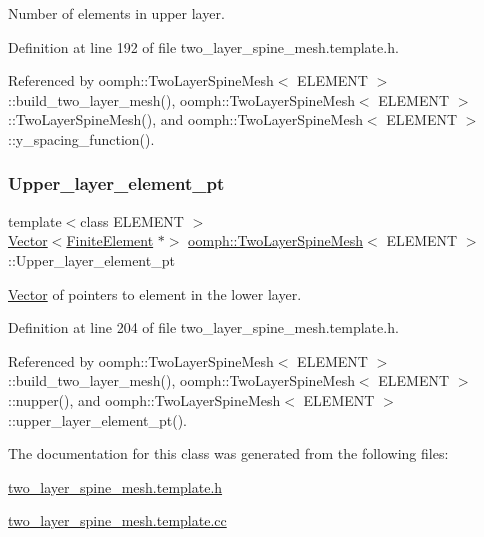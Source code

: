 Number of elements in upper layer. 



Definition at line 192 of file two\+\_\+layer\+\_\+spine\+\_\+mesh.\+template.\+h.



Referenced by oomph\+::\+Two\+Layer\+Spine\+Mesh$<$ E\+L\+E\+M\+E\+N\+T $>$\+::build\+\_\+two\+\_\+layer\+\_\+mesh(), oomph\+::\+Two\+Layer\+Spine\+Mesh$<$ E\+L\+E\+M\+E\+N\+T $>$\+::\+Two\+Layer\+Spine\+Mesh(), and oomph\+::\+Two\+Layer\+Spine\+Mesh$<$ E\+L\+E\+M\+E\+N\+T $>$\+::y\+\_\+spacing\+\_\+function().

\mbox{\label{classoomph_1_1TwoLayerSpineMesh_a7ea2169026ec75ecf1d727f022311b65}} 
\subsubsection{\texorpdfstring{Upper\+\_\+layer\+\_\+element\+\_\+pt}{Upper\_layer\_element\_pt}}
{\footnotesize\ttfamily template$<$class E\+L\+E\+M\+E\+NT $>$ \\
\hyperlink{classoomph_1_1Vector}{Vector}$<$\hyperlink{classoomph_1_1FiniteElement}{Finite\+Element} $\ast$$>$ \hyperlink{classoomph_1_1TwoLayerSpineMesh}{oomph\+::\+Two\+Layer\+Spine\+Mesh}$<$ E\+L\+E\+M\+E\+NT $>$\+::Upper\+\_\+layer\+\_\+element\+\_\+pt\hspace{0.3cm}{\ttfamily [protected]}}



\hyperlink{classoomph_1_1Vector}{Vector} of pointers to element in the lower layer. 



Definition at line 204 of file two\+\_\+layer\+\_\+spine\+\_\+mesh.\+template.\+h.



Referenced by oomph\+::\+Two\+Layer\+Spine\+Mesh$<$ E\+L\+E\+M\+E\+N\+T $>$\+::build\+\_\+two\+\_\+layer\+\_\+mesh(), oomph\+::\+Two\+Layer\+Spine\+Mesh$<$ E\+L\+E\+M\+E\+N\+T $>$\+::nupper(), and oomph\+::\+Two\+Layer\+Spine\+Mesh$<$ E\+L\+E\+M\+E\+N\+T $>$\+::upper\+\_\+layer\+\_\+element\+\_\+pt().



The documentation for this class was generated from the following files\+:\begin{DoxyCompactItemize}
\item 
\hyperlink{two__layer__spine__mesh_8template_8h}{two\+\_\+layer\+\_\+spine\+\_\+mesh.\+template.\+h}\item 
\hyperlink{two__layer__spine__mesh_8template_8cc}{two\+\_\+layer\+\_\+spine\+\_\+mesh.\+template.\+cc}\end{DoxyCompactItemize}

